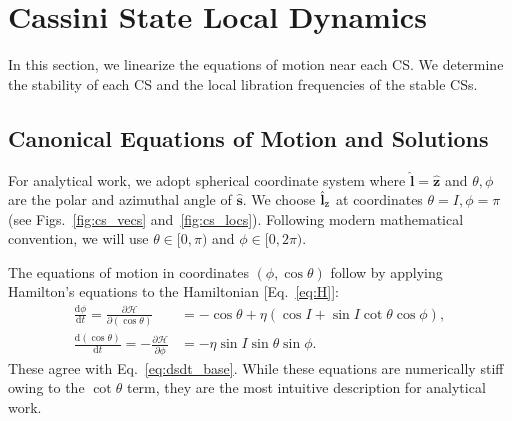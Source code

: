 \documentclass[
        fleqn,
        usenatbib,
    ]{mnras}
\newcommand*{\rd}[2]{\frac{\mathrm{d}#1}{\mathrm{d}#2}}
\newcommand*{\pd}[2]{\frac{\partial#1}{\partial#2}}
\newcommand*{\bm}[1]{\boldsymbol{\mathbf{#1}}}
\newcommand*{\uv}[1]{\hat{\bm{#1}}}
\newcommand*{\p}[1]{\left(#1\right)}
\begin{document}



\appendix

\section{Cassini State Local Dynamics}\label{s:local_dynamics}

In this section, we linearize the equations of motion near each CS\@. We
determine the stability of each CS and the local libration frequencies of the
stable CSs.

\subsection{Canonical Equations of Motion and Solutions}

For analytical work, we adopt spherical coordinate system where $\uv{l} =
\uv{z}$ and $\theta, \phi$ are the polar and azimuthal angle of $\uv{s}$. We
choose $\uv{l}_{\rm z}$ at coordinates $\theta = I, \phi = \pi$ (see
Figs.~\ref{fig:cs_vecs} and~\ref{fig:cs_locs}). Following modern mathematical
convention, we will use
$\theta \in [0, \pi)$%
and $\phi \in [0, 2\pi)$.%

The equations of motion in coordinates $\p{\phi, \cos \theta}$ follow by
applying Hamilton's equations to the Hamiltonian [Eq.~\eqref{eq:H}]:
\begin{subequations}\label{se:H_eom}
    \begin{align}
        \rd{\phi}{t} = \pd{\mathcal{H}}{(\cos\theta)}
            &= -\cos\theta + \eta\p{\cos I + \sin I \cot \theta \cos \phi},
                \label{seq:H_eom_phi_t}\\
        \rd{(\cos \theta)}{t} = -\pd{\mathcal{H}}{\phi}
            &= -\eta \sin I \sin \theta \sin \phi.
                \label{seq:H_eom_mu_t}
    \end{align}
\end{subequations}
These agree with Eq.~\eqref{eq:dsdt_base}. While these equations are numerically
stiff owing to the $\cot\theta$ term, they are the most intuitive description
for analytical work.
\end{document}
